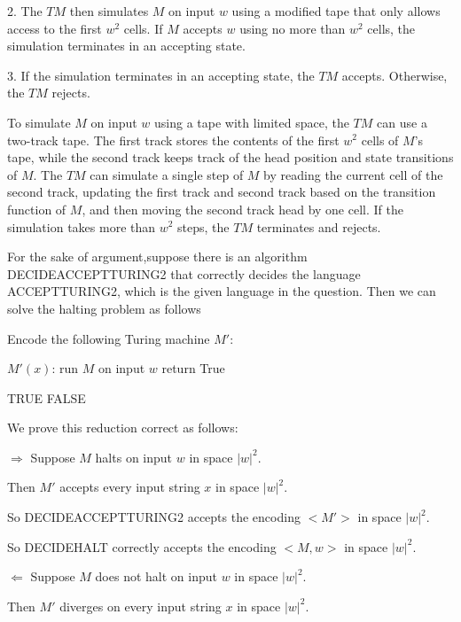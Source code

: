 \documentclass[12pt,a4paper]{article}
\newcommand{\question}[1]{\bigskip\noindent{\textbf{Q{#1} solution}}}
\begin{document}
2. The $TM$ then simulates $M$ on input $w$ using a modified tape that only allows access to the first $w^2$ cells. If $M$ accepts $w$ using no more than $w^2$ cells, the simulation terminates in an accepting state.

3. If the simulation terminates in an accepting state, the $TM$ accepts. Otherwise, the $TM$ rejects.

To simulate $M$ on input $w$ using a tape with limited space, the $TM$ can use a two-track tape. The first track stores the contents of the first $w^2$ cells of $M$'s tape, while the second track keeps track of the head position and state transitions of $M$. The $TM$ can simulate a single step of $M$ by reading the current cell of the second track, updating the first track and second track based on the transition function of $M$, and then moving the second track head by one cell. If the simulation takes more than $w^2$ steps, the $TM$ terminates and rejects.

\question{35.B}

For the sake of argument,suppose there is an algorithm DECIDEACCEPTTURING2 that correctly decides the language ACCEPTTURING2, which is the given language in the question. Then we can solve the halting problem as follows
\begin{algorithm}
	\begin{algorithmic}
		\State Encode the following Turing machine $M'$:

		\State\quad $M'(x)$:
		\State\quad\quad run $M$ on input $w$
		\State\quad\quad return True
		
		\State \Return TRUE
		\Else{}
		\State \Return FALSE 
		\EndIf
		\EndFunction
	\end{algorithmic}
\end{algorithm}

We prove this reduction correct as follows:

$\Longrightarrow$ Suppose $M$ halts on input $w$ in space ${|w|}^2$.
     
	  Then $M'$ accepts every input string $x$ in space ${|w|}^2$.

	  So DECIDEACCEPTTURING2 accepts the encoding $<M'>$ in space ${|w|}^2$.

	  So DECIDEHALT correctly accepts the encoding $<M,w>$ in space ${|w|}^2$.


$\Longleftarrow$ Suppose $M$ does not halt on input $w$ in space ${|w|}^2$.

     Then $M'$ diverges on every input string $x$ in space ${|w|}^2$.
\end{document}

